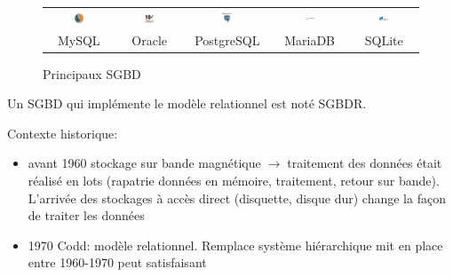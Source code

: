 \documentclass[a4paper,11pt]{article}
\begin{document}
\begin{Form}
\begin{figure}[!h]
\centering
\begin{tabular}{ccccc}
\includegraphics[width=0.15\textwidth]{ressources/mysql.png} &
\includegraphics[width=0.15\textwidth]{ressources/oracle.png} &
\includegraphics[width=0.15\textwidth]{ressources/postgresql.png}
&
\includegraphics[width=0.15\textwidth]{ressources/maria.png}
&
\includegraphics[width=0.15\textwidth]{ressources/sqlite.png} \\
MySQL &
Oracle &
PostgreSQL &
MariaDB &
SQLite
\end{tabular}
\caption{Principaux SGBD}
\label{sgbd}
\end{figure}
Un SGBD qui implémente le modèle relationnel est noté SGBDR. 
\begin{commentprof}
Contexte historique:
\begin{itemize}
\item avant 1960 stockage sur bande magnétique$\;\rightarrow\;$traitement des données était réalisé en lots (rapatrie données en mémoire, traitement, retour sur bande). L'arrivée des stockages à accès direct (disquette, disque dur) change la façon de traiter les données
\item 1970 Codd: modèle relationnel. Remplace système hiérarchique mit en place entre 1960-1970 peut satisfaisant

\end{itemize}
\end{commentprof}
\end{Form}
\end{document}
